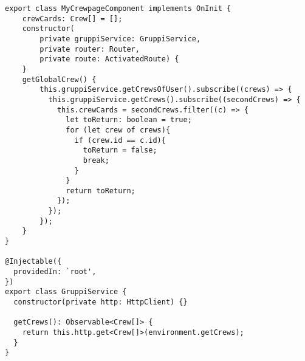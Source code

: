 \begin{lstlisting}[style=Java, caption = {Esempio implementazione \textit{pattern Observer}}]
export class MyCrewpageComponent implements OnInit {
    crewCards: Crew[] = [];
    constructor(
        private gruppiService: GruppiService,
        private router: Router,
        private route: ActivatedRoute) {
    }
    getGlobalCrew() {
        this.gruppiService.getCrewsOfUser().subscribe((crews) => {
          this.gruppiService.getCrews().subscribe((secondCrews) => {
            this.crewCards = secondCrews.filter((c) => {
              let toReturn: boolean = true;
              for (let crew of crews){
                if (crew.id == c.id){
                  toReturn = false;
                  break;
                }
              }
              return toReturn;
            });
          });
        });
    }
}

@Injectable({
  providedIn: `root',
})
export class GruppiService {
  constructor(private http: HttpClient) {}

  getCrews(): Observable<Crew[]> {
    return this.http.get<Crew[]>(environment.getCrews);
  }
}
\end{lstlisting}